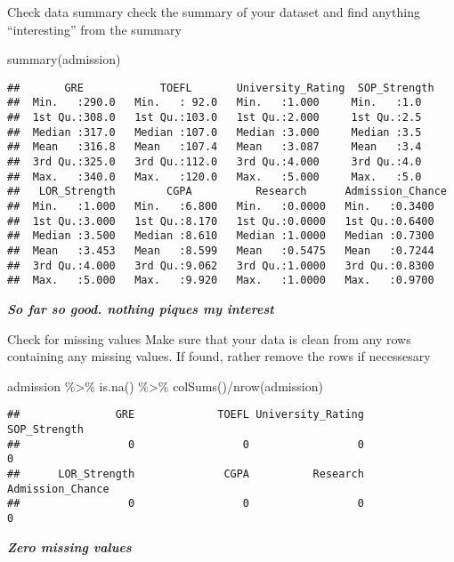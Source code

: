 \documentclass[
  ignorenonframetext,
]{beamer}
\newenvironment{Shaded}{\begin{snugshade}}{\end{snugshade}}
\newcommand{\FunctionTok}[1]{\textcolor[rgb]{0.00,0.00,0.00}{#1}}
\newcommand{\NormalTok}[1]{#1}
\newcommand{\SpecialCharTok}[1]{\textcolor[rgb]{0.00,0.00,0.00}{#1}}
\begin{document}
\begin{frame}[fragile]{Check data summary}
\protect\hypertarget{check-data-summary}{}
check the summary of your dataset and find anything ``interesting'' from
the summary

\begin{Shaded}
\begin{Highlighting}[]
\FunctionTok{summary}\NormalTok{(admission)}
\end{Highlighting}
\end{Shaded}

\begin{verbatim}
##       GRE            TOEFL       University_Rating  SOP_Strength
##  Min.   :290.0   Min.   : 92.0   Min.   :1.000     Min.   :1.0  
##  1st Qu.:308.0   1st Qu.:103.0   1st Qu.:2.000     1st Qu.:2.5  
##  Median :317.0   Median :107.0   Median :3.000     Median :3.5  
##  Mean   :316.8   Mean   :107.4   Mean   :3.087     Mean   :3.4  
##  3rd Qu.:325.0   3rd Qu.:112.0   3rd Qu.:4.000     3rd Qu.:4.0  
##  Max.   :340.0   Max.   :120.0   Max.   :5.000     Max.   :5.0  
##   LOR_Strength        CGPA          Research      Admission_Chance
##  Min.   :1.000   Min.   :6.800   Min.   :0.0000   Min.   :0.3400  
##  1st Qu.:3.000   1st Qu.:8.170   1st Qu.:0.0000   1st Qu.:0.6400  
##  Median :3.500   Median :8.610   Median :1.0000   Median :0.7300  
##  Mean   :3.453   Mean   :8.599   Mean   :0.5475   Mean   :0.7244  
##  3rd Qu.:4.000   3rd Qu.:9.062   3rd Qu.:1.0000   3rd Qu.:0.8300  
##  Max.   :5.000   Max.   :9.920   Max.   :1.0000   Max.   :0.9700
\end{verbatim}

\textbf{\emph{So far so good. nothing piques my interest}}
\end{frame}

\begin{frame}[fragile]{Check for missing values}
\protect\hypertarget{check-for-missing-values}{}
Make sure that your data is clean from any rows containing any missing
values. If found, rather remove the rows if necessesary

\begin{Shaded}
\begin{Highlighting}[]
\NormalTok{admission }\SpecialCharTok{\%\textgreater{}\%} 
  \FunctionTok{is.na}\NormalTok{() }\SpecialCharTok{\%\textgreater{}\%} 
  \FunctionTok{colSums}\NormalTok{()}\SpecialCharTok{/}\FunctionTok{nrow}\NormalTok{(admission)}
\end{Highlighting}
\end{Shaded}

\begin{verbatim}
##               GRE             TOEFL University_Rating      SOP_Strength 
##                 0                 0                 0                 0 
##      LOR_Strength              CGPA          Research  Admission_Chance 
##                 0                 0                 0                 0
\end{verbatim}

\textbf{\emph{Zero missing values}}
\end{frame}
\end{document}
